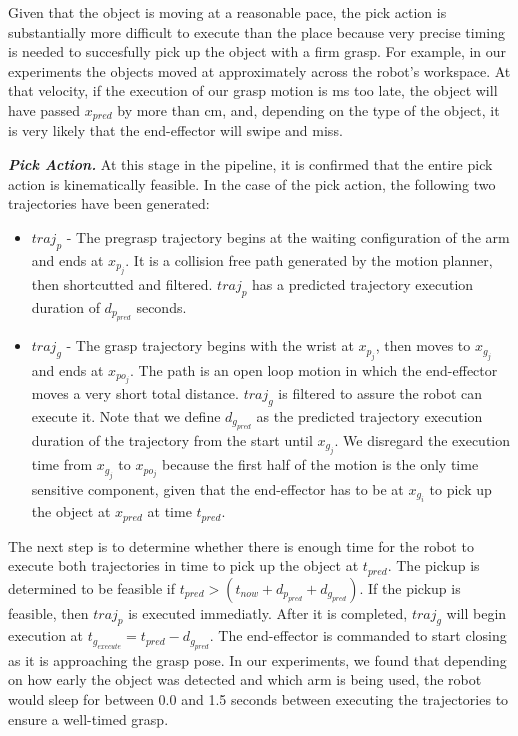 \documentclass[letterpaper, 10 pt, conference]{ieeeconf}  %
\begin{document}
Given that the object is moving at a reasonable pace, the pick action
is substantially more difficult to execute than the place because very
precise timing is needed to succesfully pick up the object with a firm
grasp. For example, in our experiments the objects moved at
approximately  across the robot's
workspace. At that velocity, if the execution of our grasp motion is
\unit[100]{ms} too late, the object will have passed $x_{pred}$ by
more than \unit[3]{cm}, and, depending on the type of the object, it
is very likely that the end-effector will swipe and miss.

\textit{\textbf{Pick Action.}} 
At this stage in the pipeline, it is confirmed that the entire pick action is kinematically feasible. In the case of the pick action, the following two trajectories have been generated:

\begin{itemize}
\item $traj_{p}$ - The pregrasp trajectory begins at the waiting configuration of the arm and ends at $x_{p_{j}}$. It is a collision free path generated by the motion planner, then shortcutted and filtered. $traj_{p}$ has a predicted trajectory execution duration of $d_{p_{pred}}$ seconds.
\item $traj_{g}$ - The grasp trajectory begins with the wrist at $x_{p_{j}}$, then moves to $x_{g_{j}}$ and ends at $x_{po_{j}}$. The path is an open loop motion in which the end-effector moves a very short total distance. $traj_{g}$ is filtered to assure the robot can execute it. Note that we define $d_{g_{pred}}$ as the predicted trajectory execution duration of the trajectory from the start until $x_{g_{j}}$. We disregard the execution time from $x_{g_{j}}$ to $x_{po_{j}}$ because the first half of the motion is the only time sensitive component, given that the end-effector has to be at $x_{g_i}$ to pick up the object at $x_{pred}$ at time $t_{pred}$.
\end{itemize}

The next step is to determine whether there is enough time for the
robot to execute both trajectories in time to pick up the object at
$t_{pred}$. The pickup is determined to be feasible if $t_{pred} >
(t_{now} + d_{p_{pred}} + d_{g_{pred}})$. If the pickup is feasible,
then $traj_{p}$ is executed immediatly. After it is completed,
$traj_{g}$ will begin execution at $t_{g_{execute}} = t_{pred} -
d_{g_{pred}}$. The end-effector is commanded to start closing as it is
approaching the grasp pose. In our experiments, we found that
depending on how early the object was detected and which arm is being
used, the robot would sleep for between 0.0 and 1.5 seconds between
executing the trajectories to ensure a well-timed grasp.
\end{document}
